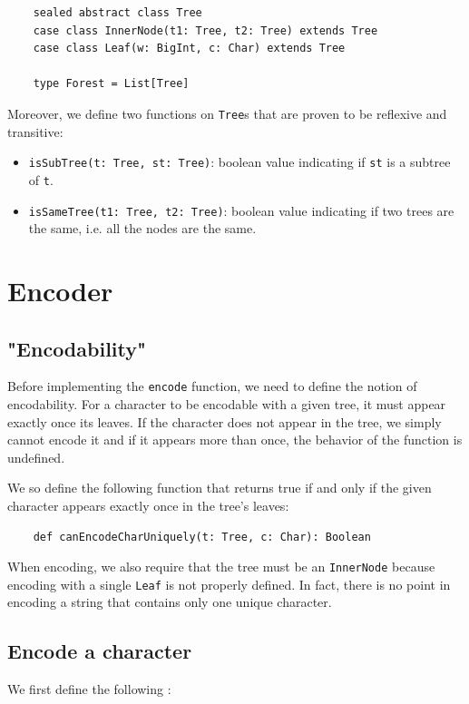 \documentclass[a4paper,UKenglish,cleveref, autoref, thm-restate]{lipics-v2021}
\begin{document}
\begin{lstlisting}
    sealed abstract class Tree
    case class InnerNode(t1: Tree, t2: Tree) extends Tree
    case class Leaf(w: BigInt, c: Char) extends Tree
  
    type Forest = List[Tree]
\end{lstlisting}

Moreover, we define two functions on \lstinline{Tree}s that are proven to be reflexive and transitive:
\begin{itemize}
    \item \lstinline{isSubTree(t: Tree, st: Tree)}: boolean value indicating if \lstinline{st} is a subtree of \lstinline{t}.
    \item \lstinline{isSameTree(t1: Tree, t2: Tree)}: boolean value indicating if two trees are the same, i.e. all the nodes are the same.
\end{itemize}

\section{Encoder}

\subsection{"Encodability"}
Before implementing the \lstinline{encode} function, we need to define the notion of encodability. For a character to be encodable with a given tree, it must appear exactly once its leaves.
If the character does not appear in the tree, we simply cannot encode it and if it appears more than once, the behavior of the function is undefined.

We so define the following function that returns true if and only if the given character appears exactly once in the tree's leaves:

\begin{lstlisting}
    def canEncodeCharUniquely(t: Tree, c: Char): Boolean
\end{lstlisting}

When encoding, we also require that the tree must be an \lstinline{InnerNode} because encoding with a single \lstinline{Leaf} is not properly defined. In fact, there is no point in encoding a string that contains only one unique character.

\subsection{Encode a character}
We first define the following :
\end{document}
